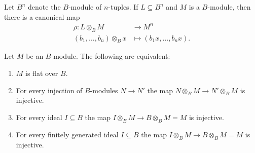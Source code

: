 \begin{rem}\label{rem:canonical-map-into-Mn}
    Let $B^n$ denote the $B$-module of $n$-tuples. If $L\subseteq B^n$ and $M$ is a $B$-module, then there is a canonical map
    \begin{align*}
        \rho\colon L\otimes_BM&\to M^n\\
        (b_1,\dots,b_n)\otimes_Bx&\mapsto(b_1x,\dots,b_nx).
    \end{align*}
\end{rem}

\begin{thm}
    Let\/ $M$ be an\/ $B$-module. The following are equivalent:
    \begin{enumerate}[\rm a)]
        \item $M$ is flat over\/ $B$.
        \item For every injection of\/ $B$-modules\/ $N\to N'$ the map\/ $N\otimes_BM\to N'\otimes_BM$ is injective.
        \item For every ideal\/ $I\subseteq B$ the map\/ $I\otimes_B M\to B\otimes_BM=M$ is injective.
        \item For every finitely generated ideal\/ $I\subseteq B$ the map\/ $I\otimes_BM\to B\otimes_BM=M$ is injective.
    \end{enumerate}
\end{thm}

